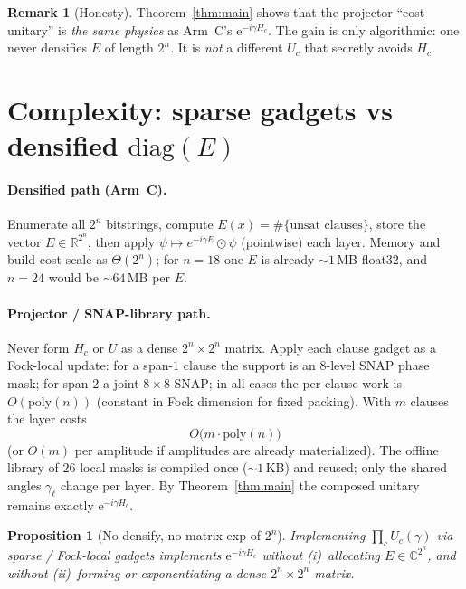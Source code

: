 \documentclass[11pt]{article}
\newtheorem{proposition}{Proposition}
\theoremstyle{definition}
\newtheorem{remark}{Remark}
\begin{document}
\begin{remark}[Honesty]
Theorem~\ref{thm:main} shows that the projector ``cost unitary'' is
\emph{the same physics} as Arm~C's $\mathrm{e}^{-i\gamma H_c}$.  The
gain is only algorithmic: one never densifies $E$ of length $2^n$.
It is \emph{not} a different $U_c$ that secretly avoids $H_c$.
\end{remark}

\section{Complexity: sparse gadgets vs densified $\mathrm{diag}(E)$}

\paragraph{Densified path (Arm~C).}
Enumerate all $2^n$ bitstrings, compute $E(x)=\#\{\text{unsat clauses}\}$,
store the vector $E\in\mathbb{R}^{2^n}$, then apply
$\psi\mapsto e^{-i\gamma E}\odot\psi$ (pointwise) each layer.
Memory and build cost scale as $\Theta(2^n)$; for $n=18$ one $E$ is
already $\sim 1$\,MB float32, and $n=24$ would be $\sim 64$\,MB per $E$.

\paragraph{Projector / SNAP-library path.}
Never form $H_c$ or $U$ as a dense $2^n\times 2^n$ matrix.  Apply each
clause gadget as a Fock-local update: for a span-$1$ clause the support
is an $8$-level SNAP phase mask; for span-$2$ a joint $8\times 8$ SNAP;
in all cases the per-clause work is $O(\mathrm{poly}(n))$ (constant in
Fock dimension for fixed packing).  With $m$ clauses the layer costs
\begin{equation}
  O\bigl(m\cdot\mathrm{poly}(n)\bigr)
\end{equation}
(or $O(m)$ per amplitude if amplitudes are already materialized).
The offline library of $26$ local masks is compiled once
($\sim 1$\,KB) and reused; only the shared angles $\gamma_\ell$ change
per layer.  By Theorem~\ref{thm:main} the composed unitary remains
exactly $\mathrm{e}^{-i\gamma H_c}$.

\begin{proposition}[No densify, no matrix-exp of $2^n$]
\label{prop:complexity}
Implementing $\prod_c U_c(\gamma)$ via sparse / Fock-local gadgets
implements $\mathrm{e}^{-i\gamma H_c}$ without (i)~allocating
$E\in\mathbb{C}^{2^n}$, and without (ii)~forming or exponentiating a
dense $2^n\times 2^n$ matrix.
\end{proposition}
\end{document}

